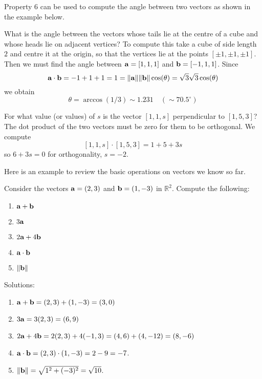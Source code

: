 Property 6 can be used to compute the angle between two vectors as shown in the example below.  
\begin{example}
What is the angle between the vectors whose tails lie at the
centre of a cube and whose heads lie on adjacent vertices?  {\rm To compute
this take a cube of side length $2$ and centre it at the origin, so
that the vertices lie at the points $[\pm 1, \pm 1, \pm1]$.  Then we
must find the angle between $\aa=[1, 1, 1]$ and $\bb=[-1, 1, 1]$.
Since
\[
\aa\cdot\bb = -1 + 1 + 1 = 1 =
\|\aa\|\|\bb\|\cos(\theta)=\sqrt{3}\sqrt{3}\cos(\theta)
\]
we obtain
\[
\theta = \arccos(1/3) \sim 1.231 \quad (\sim 70.5^\circ)
\]}
\end{example}

\begin{example}
For what value (or values) of $s$ is the vector $[1,1,s]$ perpendicular to  $[1,5,3]$? 
{\rm The dot product of the two vectors must be zero for them to be orthogonal. We compute 
\[
[1,1,s] \cdot [1,5,3] = 1+5+3s 
\]
so $6+3s=0$ for orthogonality, $s=-2$.} 
\end{example} 

Here is an example to review the basic operations on vectors we know so far.
\begin{example}
Consider the vectors ${\bf a} = (2,3)$ and ${\bf b} =
(1,-3)$ in $\mathbb{R}^2$. Compute the following:
{\begin{enumerate}
\renewcommand{\labelenumi}{(\alph{enumi})}
\item ${\bf a} + {\bf b}$
\item $3 {\bf a}$
\item $2{\bf a} + 4{\bf b}$
\item ${\bf a} \cdot {\bf b}$
\item $\| {\bf b} \|$
\end{enumerate}}
{\rm Solutions:
\begin{enumerate}
\renewcommand{\labelenumi}{(\alph{enumi})}
\item $\aa + \bb = (2,3)+(1,-3) = (3,0)$
\item $3 \aa = 3 (2,3) = (6,9)$
\item $2\aa + 4\bb = 2(2,3) + 4(-1,3) = (4,6)+(4,-12) = (8,-6)$
\item $\aa \cdot \bb = (2,3) \cdot (1,-3) = 2-9 = -7$.
\item $\| \bb \| = \sqrt{1^2 + (-3)^2} = \sqrt{10}$.
\end{enumerate}}
\end{example}

